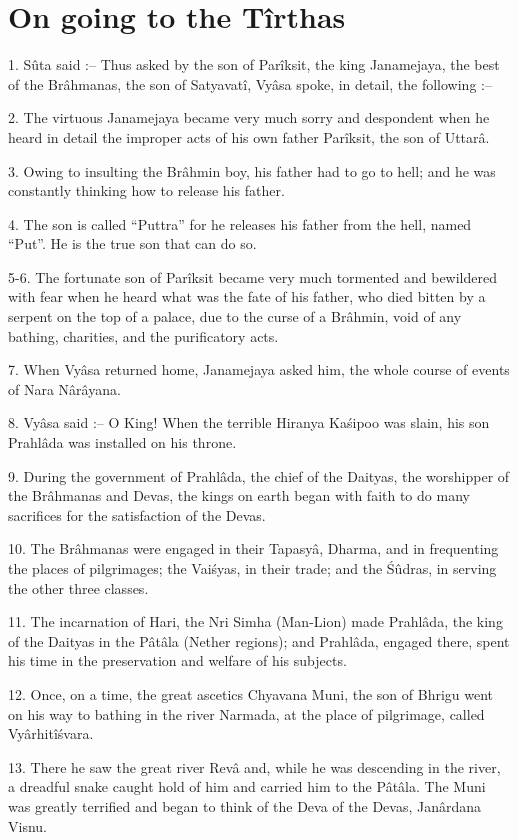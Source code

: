 ﻿\chapter{On going to the T\^irthas}

1. Sûta said :-- Thus asked by the son of Par\^iksit, the king Janamejaya, the best of the Br\^ahmanas, the son of Satyavat\^i, Vy\^asa spoke, in detail, the following :--

2. The virtuous Janamejaya became very much sorry and despondent when he heard in detail the improper acts of his own father Par\^iksit, the son of Uttar\^a.

3. Owing to insulting the Br\^ahmin boy, his father had to go to hell; and he was constantly thinking how to release his father.

4. The son is called ``Puttra'' for he releases his father from the hell, named ``Put''. He is the true son that can do so.

5-6. The fortunate son of Par\^iksit became very much tormented and bewildered with fear when he heard what was the fate of his father, who died bitten by a serpent on the top of a palace, due to the curse of a Br\^ahmin, void of any bathing, charities, and the purificatory acts.

7. When Vy\^asa returned home, Janamejaya asked him, the whole course of events of Nara N\^ar\^ayana.

8. Vy\^asa said :-- O King! When the terrible Hiranya Ka\'sipoo was slain, his son Prahl\^ada was installed on his throne.

9. During the government of Prahl\^ada, the chief of the Daityas, the worshipper of the Br\^ahmanas and Devas, the kings on earth began with faith to do many sacrifices for the satisfaction of the Devas.

10. The Br\^ahmanas were engaged in their Tapasy\^a, Dharma, and in frequenting the places of pilgrimages; the Vai\'syas, in their trade; and the \'Sûdras, in serving the other three classes.

11. The incarnation of Hari, the Nri Simha (Man-Lion) made Prahl\^ada, the king of the Daityas in the P\^at\^ala (Nether regions); and Prahl\^ada, engaged there, spent his time in the preservation and welfare of his subjects.

12. Once, on a time, the great ascetics Chyavana Muni, the son of Bhrigu went on his way to bathing in the river Narmada, at the place of pilgrimage, called Vy\^arhit\^i\'svara.

13. There he saw the great river Rev\^a and, while he was descending in the river, a dreadful snake caught hold of him and carried him to the P\^at\^ala. The Muni was greatly terrified and began to think of the Deva of the Devas, Jan\^ardana Visnu.

